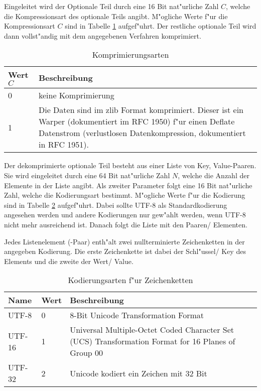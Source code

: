 Eingeleitet wird der Optionale Teil durch eine 16 Bit nat"urliche Zahl $C$, welche die Kompressionsart des optionale Teils angibt. M"ogliche Werte f"ur die Kompressionsart $C$ sind in Tabelle \ref{tableOptionalPartCompressing} aufgef"uhrt. Der restliche optionale Teil wird dann vollst"andig mit dem angegebenen Verfahren komprimiert.

\begin{table}[htbp]
\begin{center}
\begin{tabular}{|p{15mm}|p{100mm}|}\hline
	Wert $C$ & Beschreibung \\\hline\hline
	0 & keine Komprimierung\\\hline
	1 & Die Daten sind im zlib Format komprimiert. Dieser ist ein Warper (dokumentiert im RFC 1950) f"ur einen Deflate Datenstrom (verlustlosen Datenkompression, dokumentiert in RFC 1951). \\\hline

\end{tabular}
\end{center}
\caption{Komprimierungsarten}
\label{tableOptionalPartCompressing}
\end{table}


Der dekomprimierte optionale Teil besteht aus einer Liste von Key, Value-Paaren. Sie wird eingeleitet durch eine 64 Bit nat"urliche Zahl $N$, welche die Anzahl der Elemente in der Liste angibt. Als zweiter Parameter folgt eine 16 Bit nat"urliche Zahl, welche die Kodierungsart bestimmt. M"ogliche Werte f"ur die Kodierung sind in Tabelle \ref{tableOptionalPartCoding} aufgef"uhrt. Dabei sollte UTF-8 als Standardkodierung angesehen werden und andere Kodierungen nur gew"ahlt werden, wenn UTF-8 nicht mehr ausreichend ist.
Danach folgt die Liste mit den Paaren/ Elementen.

Jedes Listenelement (-Paar) enth"alt zwei nullterminierte Zeichenketten in der angegeben Kodierung. Die erste Zeichenkette ist dabei der Schl"ussel/ Key des Elements und die zweite der Wert/ Value.

\begin{table}[htbp]
\begin{center}
\begin{tabular}{|p{20mm}|p{15mm}|p{80mm}|}\hline
	Name & Wert & Beschreibung \\\hline\hline
	UTF-8 & 0 & 8-Bit Unicode Transformation Format\\\hline
	UTF-16 & 1 & Universal Multiple-Octet Coded Character Set (UCS) Transformation Format for 16 Planes of Group 00\\\hline
	UTF-32 & 2 & Unicode kodiert ein Zeichen mit 32 Bit\\\hline

\end{tabular}
\end{center}
\caption{Kodierungsarten f"ur Zeichenketten}
\label{tableOptionalPartCoding}
\end{table}

